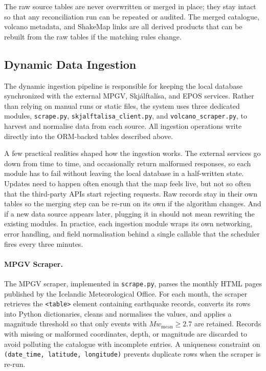\documentclass[12pt]{article}
\begin{document}
The raw source tables are never overwritten or merged in place; they stay intact so that any reconciliation run can be repeated or audited. The merged catalogue, volcano metadata, and ShakeMap links are all derived products that can be rebuilt from the raw tables if the matching rules change.

\subsection{Dynamic Data Ingestion}

The dynamic ingestion pipeline is responsible for keeping the local database synchronized with the external MPGV, Skjálftalísa, and EPOS services. Rather than relying on manual runs or static files, the system uses three dedicated modules, \texttt{scrape.py}, \texttt{skjalftalisa\_client.py}, and \texttt{volcano\_scraper.py}, to harvest and normalise data from each source. All ingestion operations write directly into the ORM-backed tables described above.

A few practical realities shaped how the ingestion works. The external services go down from time to time, and occasionally return malformed responses, so each module has to fail without leaving the local database in a half-written state. Updates need to happen often enough that the map feels live, but not so often that the third-party APIs start rejecting requests. Raw records stay in their own tables so the merging step can be re-run on its own if the algorithm changes. And if a new data source appears later, plugging it in should not mean rewriting the existing modules. In practice, each ingestion module wraps its own networking, error handling, and field normalisation behind a single callable that the scheduler fires every three minutes.

\paragraph{MPGV Scraper.}

The MPGV scraper, implemented in \texttt{scrape.py}, parses the monthly HTML pages published by the Icelandic Meteorological Office. For each month, the scraper retrieves the \texttt{<table>} element containing earthquake records, converts its rows into Python dictionaries, cleans and normalises the values, and applies a magnitude threshold so that only events with $Mw_{\text{mean}} \geq 2.7$ are retained. Records with missing or malformed coordinates, depth, or magnitude are discarded to avoid polluting the catalogue with incomplete entries. A uniqueness constraint on \texttt{(date\_time, latitude, longitude)} prevents duplicate rows when the scraper is re-run.
\end{document}
